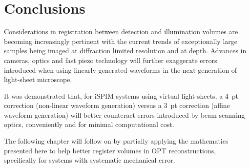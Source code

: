 \section{Conclusions}

Considerations in registration between detection and illumination volumes\cite{royer_adaptive_2016} are becoming increasingly pertinent with the current trends of exceptionally large samples\cite{chen_expansion_2015} being imaged at diffraction limited resolution and at depth\cite{wang_direct_2015,truong_deep_2011}.
Advances in cameras\cite{zheng_0.5_2014,brady_multiscale_2012}, optics\cite{sofroniew_large_2016} and fast piezo technology will further exaggerate errors introduced when using linearly generated waveforms in the next generation of light-sheet microscope.

It was demonstrated that, for \gls{iSPIM} systems using virtual light-sheets, a 4~pt correction (non-linear waveform generation) versus a 3~pt correction (affine waveform generation) will better counteract errors introduced by beam scanning optics, conveniently and for minimal computational cost.

The following chapter will follow on by partially applying the mathematics presented here to help better register volumes in \gls{OPT} reconstructions, specifically for systems with systematic mechanical error.







